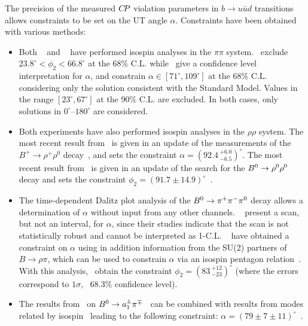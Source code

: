 The precision of the measured $C\!P$ violation parameters in
$b \to u\bar{u}d$ transitions allows 
constraints to be set on the UT angle $\alpha$. 
Constraints have been obtained with various methods:
\begin{itemize}\setlength{\itemsep}{0.5ex}
\item 
  Both \babar~\cite{Lees:2012mma}
  and  \belle~\cite{Adachi:2013mae} have performed 
  isospin analyses in the $\pi\pi$ system.
  \belle\ exclude $23.8^\circ < \phi_2 < 66.8^\circ$ at the 68\%  C.L. while
  \babar\ give a confidence level interpretation for $\alpha$, and constrain
  $\alpha \in \left[ 71^\circ, 109^\circ \right]$ at the 68\%
  C.L. considering only the solution consistent with the Standard Model.
  Values in the range $\left[ 23^\circ, 67^\circ \right]$ at the 90\% C.L. are
  excluded.
  In both cases, only solutions in $0^\circ$--$180^\circ$ are considered.

\item
  Both experiments have also performed isospin analyses in the $\rho\rho$
  system. 
  The most recent result from \babar\ is given in an update of the
  measurements of the $B^+\to\rho^+\rho^0$ decay~\cite{Aubert:2009it}, and
  sets the constraint $\alpha = \left( 92.4 \,^{+6.0}_{-6.5}\right)^\circ$.
  The most recent result from \belle\ is given in an update of the
  search for the $B^0 \to \rho^0\rho^0$ decay and sets the constraint
  $\phi_2 = \left( 91.7 \pm 14.9 \right)^\circ$~\cite{:2008et}.

\item
  The time-dependent Dalitz plot analysis of the $B^0 \to \pi^+\pi^-\pi^0$
  decay allows a determination of $\alpha$ without input from any other 
  channels.
  \babar~\cite{Lees:2013nwa} present a scan, but not an interval, for $\alpha$, since
  their studies indicate that the scan is not statistically robust and cannot
  be interpreted as 1-C.L. 
  \belle~\cite{Kusaka:2007dv,:2007mj} have obtained a constraint on $\alpha$
  using in addition information from the SU(2) partners of 
  $B \to \rho\pi$, which can be used to constrain $\alpha$
  via an isospin pentagon relation~\cite{Lipkin:1991st}. 
  With this analysis,
  \belle\ obtain the constraint $\phi_2 = (83 \, ^{+12}_{-23})^\circ$
  (where the errors correspond to $1\sigma$, \ie\ $68.3\%$ confidence level).

\item 
  The results from \babar\ on $B^0 \to a_1^\pm \pi^\mp$~\cite{Aubert:2006gb} can be
  combined with results from modes related by isospin~\cite{Gronau:2005kw}
  leading to the following constraint: 
  $\alpha = \left( 79 \pm 7 \pm 11 \right)^\circ$~\cite{:2009ii}.


\end{itemize}
